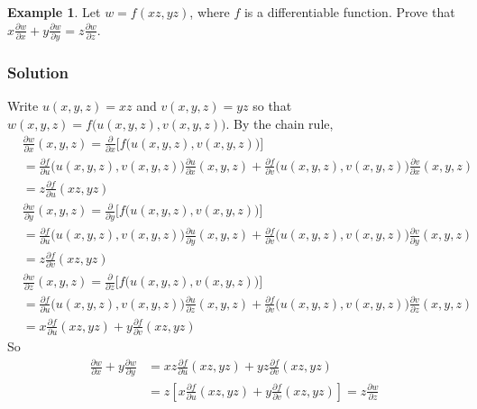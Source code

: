\documentclass[10pt,handout]{beamer}
\newcommand{\ds}{\displaystyle}
\theoremstyle{definition}
\newtheorem*{ex}{Example}
\newcommand{\pdiff}[2]{\frac{\partial #1}{\partial #2}}
\begin{document}
\begin{frame}
  \begin{ex}
    Let $w = f(x z, y z)$, where $f$ is a differentiable function. Prove that $\ds x\frac{\partial w}{\partial x} + y\frac{\partial w}{\partial y} = z\frac{\partial w}{\partial z}$.
  \end{ex}
\end{frame}

\begin{frame}[allowframebreaks]
  \frametitle{Solution}
  Write $u(x,y,z)=xz$ and $v(x,y,z)=yz$ so that $w(x,y,z) = f\big(u(x,y,z), v(x,y,z)\big)$. By the chain rule,
  \begin{align*}
    &\pdiff{w}{x}(x,y,z) = \pdiff{}{x}\big[f \big(u(x,y,z), v(x,y,z)\big)\big] \\
    &= \pdiff{f}{u}\big(u(x,y,z), v(x,y,z)\big)\pdiff{u}{x}(x,y,z) + \pdiff{f}{v}\big(u(x,y,z), v(x,y,z)\big)\pdiff{v}{x}(x,y,z) \\ 
    &= z\pdiff{f}{u}(xz, yz)
  \end{align*}
  \begin{align*}
    &\pdiff{w}{y}(x,y,z) = \pdiff{}{y}\big[f \big(u(x,y,z), v(x,y,z)\big)\big] \\
    &= \pdiff{f}{u}\big(u(x,y,z), v(x,y,z)\big)\pdiff{u}{y}(x,y,z) + \pdiff{f}{v}\big(u(x,y,z), v(x,y,z)\big)\pdiff{v}{y}(x,y,z) \\
    &= z\pdiff{f}{v}(xz, yz)
  \end{align*}
  \begin{align*}
    &\pdiff{w}{z}(x,y,z) = \pdiff{}{z}\big[f \big(u(x,y,z), v(x,y,z)\big)\big] \\
    &= \pdiff{f}{u}\big(u(x,y,z), v(x,y,z)\big)\pdiff{u}{z}(x,y,z) + \pdiff{f}{v}\big(u(x,y,z), v(x,y,z)\big)\pdiff{v}{z}(x,y,z) \\
    &= x\pdiff{f}{u}(xz, yz) + y\pdiff{f}{v}(xz, yz)
  \end{align*}
  So
  \begin{align*}
    \pdiff{w}{x} + y\pdiff{w}{y} &= xz\pdiff{f}{u}(xz, yz) + yz\pdiff{f}{v}(xz, yz) \\&= z\left[x\pdiff{f}{u}(xz, yz) + y\pdiff{f}{v}(xz, yz)\right] = z\pdiff{w}{z}
  \end{align*}
\end{frame}
\end{document}
